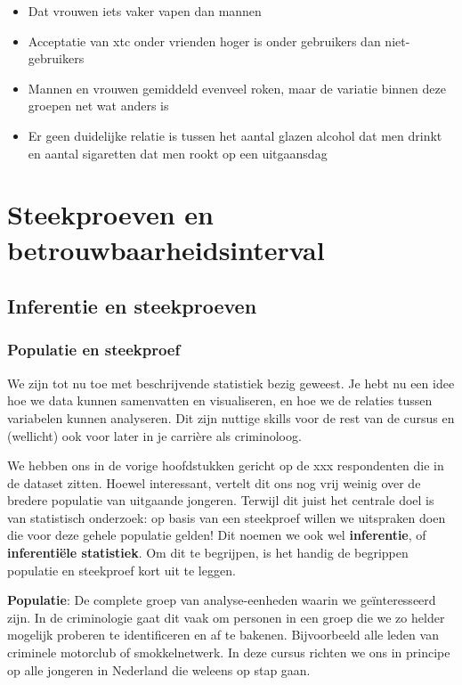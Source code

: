 \documentclass[
  letterpaper,
  DIV=11,
  numbers=noendperiod]{scrreprt}
\providecommand{\tightlist}{%
  \setlength{\itemsep}{0pt}\setlength{\parskip}{0pt}}
\begin{document}
\begin{itemize}
\tightlist
\item
  Dat vrouwen iets vaker vapen dan mannen
\item
  Acceptatie van xtc onder vrienden hoger is onder gebruikers dan
  niet-gebruikers
\item
  Mannen en vrouwen gemiddeld evenveel roken, maar de variatie binnen
  deze groepen net wat anders is
\item
  Er geen duidelijke relatie is tussen het aantal glazen alcohol dat men
  drinkt en aantal sigaretten dat men rookt op een uitgaansdag
\end{itemize}

\part{Steekproeven en betrouwbaarheidsinterval}

\chapter{Inferentie en steekproeven}\label{inferentie-en-steekproeven}

\section{Populatie en steekproef}\label{populatie-en-steekproef}

We zijn tot nu toe met beschrijvende statistiek bezig geweest. Je hebt
nu een idee hoe we data kunnen samenvatten en visualiseren, en hoe we de
relaties tussen variabelen kunnen analyseren. Dit zijn nuttige skills
voor de rest van de cursus en (wellicht) ook voor later in je carrière
als criminoloog.

We hebben ons in de vorige hoofdstukken gericht op de xxx respondenten
die in de dataset zitten. Hoewel interessant, vertelt dit ons nog vrij
weinig over de bredere populatie van uitgaande jongeren. Terwijl dit
juist het centrale doel is van statistisch onderzoek: op basis van een
steekproef willen we uitspraken doen die voor deze gehele populatie
gelden! Dit noemen we ook wel \textbf{inferentie}, of
\textbf{inferentiële statistiek}. Om dit te begrijpen, is het handig de
begrippen populatie en steekproef kort uit te leggen.

\textbf{Populatie}: De complete groep van analyse-eenheden waarin we
geïnteresseerd zijn. In de criminologie gaat dit vaak om personen in een
groep die we zo helder mogelijk proberen te identificeren en af te
bakenen. Bijvoorbeeld alle leden van criminele motorclub of
smokkelnetwerk. In deze cursus richten we ons in principe op alle
jongeren in Nederland die weleens op stap gaan.
\end{document}
